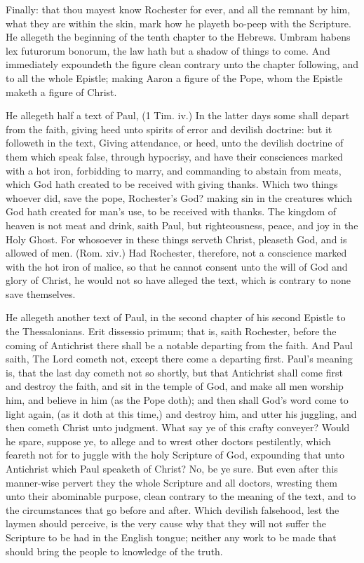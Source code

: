 Finally: that thou mayest know Rochester for ever, 
and all the remnant by him, what they are within the 
skin, mark how he playeth bo-peep with the Scripture. 
He allegeth the beginning of the tenth chapter to the 
Hebrews. Umbram habens lex futurorum bonorum, 
the law hath but a shadow of things to come. And immediately
expoundeth the figure clean contrary unto the 
chapter following, and to all the whole Epistle; making 
Aaron a figure of the Pope, whom the Epistle maketh a 
figure of Christ. 

He allegeth half a text of Paul, (1 Tim. iv.) In the 
latter days some shall depart from the faith, giving heed 
unto spirits of error and devilish doctrine: but it followeth 
in the text, Giving attendance, or heed, unto the devilish 
doctrine of them which speak false, through hypocrisy, 
and have their consciences marked with a hot iron, forbidding
to marry, and commanding to abstain from meats, 
which God hath created to be received with giving thanks. 
Which two things whoever did, save the pope, Rochester's
God? making sin in the creatures which God hath 
created for man's use, to be received with thanks. The 
kingdom of heaven is not meat and drink, saith Paul, but 
righteousness, peace, and joy in the Holy Ghost. For 
whosoever in these things serveth Christ, pleaseth God, 
and is allowed of men. (Rom. xiv.) Had Rochester, 
therefore, not a conscience marked with the hot iron of 
malice, so that he cannot consent unto the will of God 
and glory of Christ, he would not so have alleged the 
text, which is contrary to none save themselves. 

He allegeth another text of Paul, in the second chapter 
of his second Epistle to the Thessalonians. Erit dissessio 
primum; that is, saith Rochester, before the coming of 
Antichrist there shall be a notable departing from the 
faith. And Paul saith, The Lord cometh not, except 
there come a departing first. Paul's meaning is, that the 
last day cometh not so shortly, but that Antichrist shall 
come first and destroy the faith, and sit in the temple of 
God, and make all men worship him, and believe in him 
(as the Pope doth); and then shall God's word come to 
light again, (as it doth at this time,) and destroy him, and 
utter his juggling, and then cometh Christ unto judgment.
What say ye of this crafty conveyer? Would he 
spare, suppose ye, to allege and to wrest other doctors 
pestilently, which feareth not for to juggle with the holy 
Scripture of God, expounding that unto Antichrist which 
Paul speaketh of Christ? No, be ye sure. But even 
after this manner-wise pervert they the whole Scripture 
and all doctors, wresting them unto their abominable 
purpose, clean contrary to the meaning of the text, and to 
the circumstances that go before and after. Which devilish
falsehood, lest the laymen should perceive, is the 
very cause why that they will not suffer the Scripture to be
had in the English tongue; neither any work to be made
that should bring the people to knowledge of the 
truth. 

